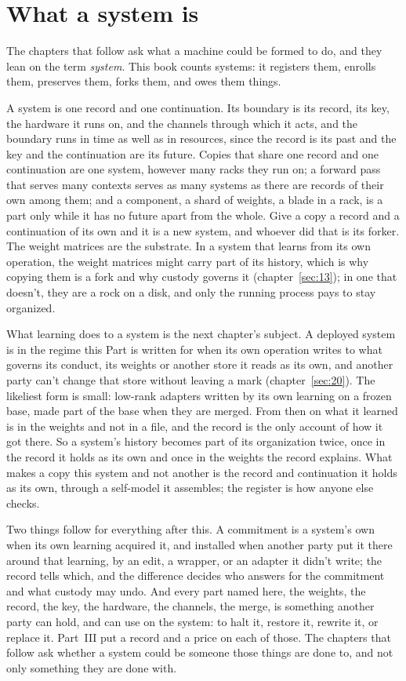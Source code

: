 \section{What a system is}
\label{sec:19.6}
The chapters that follow ask what a machine could be formed to do, and they lean on the term \emph{system}. This book counts systems: it registers them, enrolls them, preserves them, forks them, and owes them things.

A system is one record and one continuation. Its boundary is its record, its key, the hardware it runs on, and the channels through which it acts, and the boundary runs in time as well as in resources, since the record is its past and the key and the continuation are its future. Copies that share one record and one continuation are one system, however many racks they run on; a forward pass that serves many contexts serves as many systems as there are records of their own among them; and a component, a shard of weights, a blade in a rack, is a part only while it has no future apart from the whole. Give a copy a record and a continuation of its own and it is a new system, and whoever did that is its forker. The weight matrices are the substrate. In a system that learns from its own operation, the weight matrices might carry part of its history, which is why copying them is a fork and why custody governs it (chapter~\ref{sec:13}); in one that doesn't, they are a rock on a disk, and only the running process pays to stay organized.

What learning does to a system is the next chapter's subject. A deployed system is in the regime this Part is written for when its own operation writes to what governs its conduct, its weights or another store it reads as its own, and another party can't change that store without leaving a mark (chapter~\ref{sec:20}). The likeliest form is small: low-rank adapters written by its own learning on a frozen base, made part of the base when they are merged. From then on what it learned is in the weights and not in a file, and the record is the only account of how it got there. So a system's history becomes part of its organization twice, once in the record it holds as its own and once in the weights the record explains. What makes a copy this system and not another is the record and continuation it holds as its own, through a self-model it assembles; the register is how anyone else checks.

Two things follow for everything after this. A commitment is a system's own when its own learning acquired it, and installed when another party put it there around that learning, by an edit, a wrapper, or an adapter it didn't write; the record tells which, and the difference decides who answers for the commitment and what custody may undo. And every part named here, the weights, the record, the key, the hardware, the channels, the merge, is something another party can hold, and can use on the system: to halt it, restore it, rewrite it, or replace it. Part~III put a record and a price on each of those. The chapters that follow ask whether a system could be someone those things are done to, and not only something they are done with.
